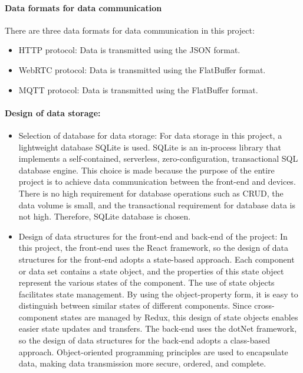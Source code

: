 \paragraph{Data formats for data communication}
There are three data formats for data communication in this project:
\begin{itemize}
\item HTTP protocol: Data is transmitted using the JSON format.
\item WebRTC protocol: Data is transmitted using the FlatBuffer format.
\item MQTT protocol: Data is transmitted using the FlatBuffer format.
\end{itemize}

\paragraph{Design of data storage:}
\begin{itemize}
\item Selection of database for data storage: 
For data storage in this project, a lightweight database SQLite is used.
SQLite is an in-process library that implements a self-contained, serverless, zero-configuration, transactional SQL database engine.
This choice is made because the purpose of the entire project is to achieve data communication between the front-end and devices. 
There is no high requirement for database operations such as CRUD, the data volume is small, and the transactional requirement for database data is not high. 
Therefore, SQLite database is chosen.
\item Design of data structures for the front-end and back-end of the project: 
In this project, the front-end uses the React framework, so the design of data structures for the front-end adopts a state-based approach.
Each component or data set contains a state object, and the properties of this state object represent the various states of the component.
The use of state objects facilitates state management. By using the object-property form, 
it is easy to distinguish between similar states of different components.
Since cross-component states are managed by Redux, this design of state objects enables easier state updates and transfers.
The back-end uses the dotNet framework, so the design of data structures for the back-end adopts a class-based approach.
Object-oriented programming principles are used to encapsulate data, making data transmission more secure, ordered, and complete.
\end{itemize}

